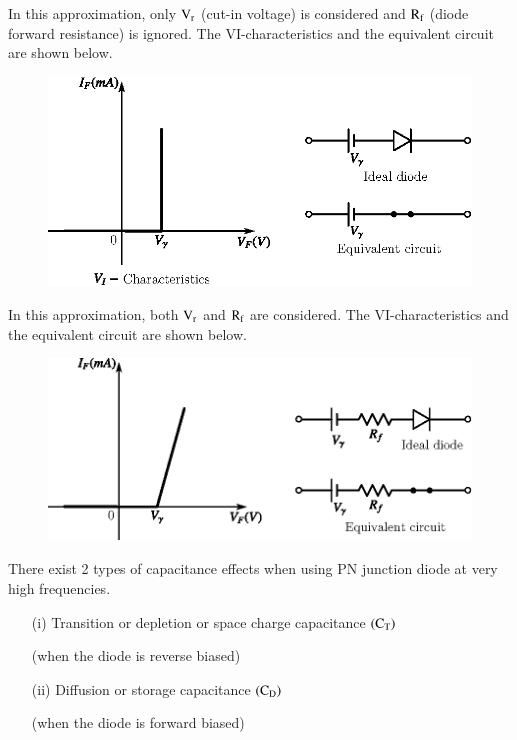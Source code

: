  In this approximation, only $\textrm{V}_{\textrm{r}}$ (cut-in voltage) is considered and $\textrm{R}_{\textrm{f}}$ (diode forward resistance) is ignored. The VI-characteristics and the equivalent circuit are shown below.
\begin{figure}[H]
\centering
\includegraphics[scale=.91]{chap1/fig1.25.eps}
\caption{}\label{fig1.25}
\end{figure}

 In this approximation, both $\textrm{V}_{\textrm{r}}$ and $\textrm{R}_{\textrm{f}}$ are considered. The VI-characteristics and the equivalent circuit are shown below.
\begin{figure}[H]
\centering
\includegraphics{chap1/fig1.26.eps}
\caption{}\label{fig1.26}
\end{figure}


There exist 2 types of capacitance effects when using PN junction diode at very high frequencies. 
\begin{itemize}
\item[(i)] Transition or depletion or space charge capacitance $(\textrm{C}_{\textrm{T}})$ 

(when the diode is reverse biased)

\item[(ii)] Diffusion or storage capacitance $(\textrm{C}_{\textrm{D}})$

(when the diode is forward biased)
\end{itemize}

